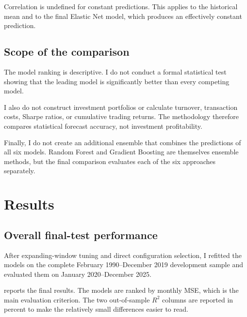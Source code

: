 \documentclass[11pt,a4paper]{article}
\begin{document}
Correlation is undefined for constant predictions. This applies to the
historical mean and to the final Elastic Net model, which produces an
effectively constant prediction.

\subsection{Scope of the comparison}

The model ranking is descriptive. I do not conduct a formal statistical test
showing that the leading model is significantly better than every competing
model.

I also do not construct investment portfolios or calculate turnover,
transaction costs, Sharpe ratios, or cumulative trading returns. The
methodology therefore compares statistical forecast accuracy, not investment
profitability.

Finally, I do not create an additional ensemble that combines the predictions
of all six models. Random Forest and Gradient Boosting are themselves ensemble
methods, but the final comparison evaluates each of the six approaches
separately.


\section{Results}
\label{sec:results}

\subsection{Overall final-test performance}

After expanding-window tuning and direct configuration selection, I refitted
the models on the complete February 1990--December 2019 development sample and
evaluated them on January 2020--December 2025.

 reports the final results. The models are ranked by
monthly MSE, which is the main evaluation criterion. The two out-of-sample
\(R^2\) columns are reported in percent to make the relatively small
differences easier to read.
\end{document}
